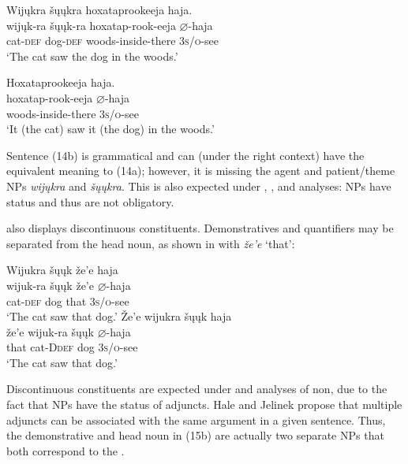 \documentclass[output=paper]{LSP/langsci}
\begin{document}
\begin{exe}
\ex\label{ex:jrs:14}
\begin{xlist} 
\glll Wij\k{u}kra	\v{s}\k{u}\k{u}kra		hoxataprookeeja 		haja.\\
wij\k{u}k-ra	\v{s}\k{u}\k{u}k-ra	hoxatap-rook-eeja 	$\varnothing$-haja \\
	cat-\textsc{def} 	dog-\textsc{def} 	woods-inside-there 	\textsc{3s/o}-see \\
\trans `The cat saw the dog in the woods.'

\ex 
\glll Hoxataprookeeja haja. \\
hoxatap-rook-eeja 	$\varnothing$-haja \\
woods-inside-there \textsc{3s/o}-see \\
\trans `It (the cat) saw it (the dog) in the woods.'
\end{xlist}
\end{exe}

Sentence (14b) is grammatical and can (under the right  context) have the equivalent meaning to (14a); however, it is missing the agent and patient/theme NPs \textit{wij\k{u}kra} and \textit{\v{s}\k{u}\k{u}kra}. This is also expected under , , and  analyses: NPs have  status and thus are not obligatory.

 also displays discontinuous constituents. Demonstratives and quantifiers may be separated from the head noun, as shown in  with \textit{\v{z}e'e} `that': 

\begin{exe}
\ex\label{ex:jrs:15}
\begin{xlist} 
\glll Wijukra	\v{s}\k{u}\k{u}k	\v{z}e'e	haja \\
wijuk-ra	\v{s}\k{u}\k{u}k	\v{z}e'e	$\varnothing$-haja \\
	cat-\textsc{def} 	dog	that		\textsc{3s/o}-see\\
\trans `The cat saw that dog.' 
\glll \v{Z}e'e	wijukra	 \v{s}\k{u}\k{u}k	haja \\
\v{z}e'e	wijuk-ra	\v{s}\k{u}\k{u}k	$\varnothing$-haja \\
that cat-D\textsc{def} dog \textsc{3s/o}-see \\
\trans `The cat saw that dog.'
\end{xlist}
\end{exe}

Discontinuous constituents are expected under  and  analyses of non, due to the fact that NPs have the status of adjuncts. Hale and Jelinek propose that multiple adjuncts can be associated with the same argument in a given sentence. Thus, the demonstrative and head noun in (15b) are actually two separate NPs that both correspond to the .
\end{document}
